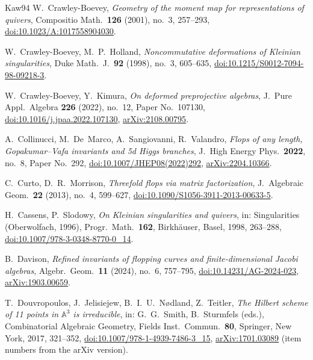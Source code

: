 \documentclass[11pt]{amsart}
\numberwithin{table}{section}
\numberwithin{figure}{section}
\numberwithin{equation}{section}
\theoremstyle{definition}
\theoremstyle{plain}
\newcommand{\A}{\mathbb{A}}
\begin{document}
\begin{thebibliography}{Kaw94}
W.~Crawley-Boevey, \emph{Geometry of the moment map for representations of quivers}, Compositio Math.\ \textbf{126} (2001), no.~3, 257--293, \href{https://doi.org/10.1023/A:1017558904030}{doi:10.1023/A:1017558904030}.

W.~Crawley-Boevey, M.~P.~Holland, \emph{Noncommutative deformations of Kleinian singularities}, Duke Math.\ J.\ \textbf{92} (1998), no.~3, 605--635, \href{https://doi.org/10.1215/S0012-7094-98-09218-3}{doi:10.1215/S0012-7094-98-09218-3}.

W.~Crawley-Boevey, Y.~Kimura, \emph{On deformed preprojective algebras}, J.\ Pure Appl.\ Algebra \textbf{226} (2022), no.~12, Paper No.~107130, \href{https://doi.org/10.1016/j.jpaa.2022.107130}{doi:10.1016/j.jpaa.2022.107130}, \href{https://arxiv.org/abs/2108.00795}{arXiv:2108.00795}.

A.~Collinucci, M.~De~Marco, A.~Sangiovanni, R.~Valandro, \emph{Flops of any length, Gopakumar--Vafa invariants and 5d Higgs branches}, J.\ High Energy Phys.\ \textbf{2022}, no.~8, Paper No.~292, \href{https://doi.org/10.1007/JHEP08(2022)292}{doi:10.1007/JHEP08(2022)292}, \href{https://arxiv.org/abs/2204.10366}{arXiv:2204.10366}.

C.~Curto, D.~R.~Morrison, \emph{Threefold flops via matrix factorization}, J.\ Algebraic Geom.\ \textbf{22} (2013), no.~4, 599--627, \href{https://doi.org/10.1090/S1056-3911-2013-00633-5}{doi:10.1090/S1056-3911-2013-00633-5}.

H.~Cassens, P.~Slodowy, \emph{On Kleinian singularities and quivers}, in: Singularities (Oberwolfach, 1996), Progr.\ Math.\ \textbf{162}, Birkh\"auser, Basel, 1998, 263--288, \href{https://doi.org/10.1007/978-3-0348-8770-0_14}{doi:10.1007/978-3-0348-8770-0\_14}.

B.~Davison, \emph{Refined invariants of flopping curves and finite-dimensional Jacobi algebras}, Algebr.\ Geom.\ \textbf{11} (2024), no.~6, 757--795, \href{https://doi.org/10.14231/AG-2024-023}{doi:10.14231/AG-2024-023}, \href{https://arxiv.org/abs/1903.00659}{arXiv:1903.00659}.

T.~Douvropoulos, J.~Jelisiejew, B.~I.~U.~N{\o}dland, Z.~Teitler, \emph{The Hilbert scheme of 11 points in $\A^3$ is irreducible}, in: G.~G.~Smith, B.~Sturmfels (eds.), Combinatorial Algebraic Geometry, Fields Inst.\ Commun.\ \textbf{80}, Springer, New York, 2017, 321--352, \href{https://doi.org/10.1007/978-1-4939-7486-3_15}{doi:10.1007/978-1-4939-7486-3\_15}, \href{https://arxiv.org/abs/1701.03089}{arXiv:1701.03089} (item numbers from the arXiv version).


\end{thebibliography}
\end{document}
